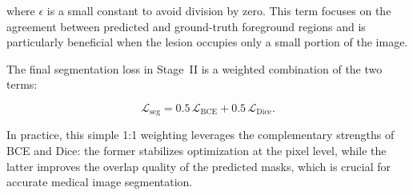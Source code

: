 \documentclass{article} %
\begin{document}
where $\epsilon$ is a small constant to avoid division by zero. This term focuses on the agreement between predicted and ground-truth foreground regions and is particularly beneficial when the lesion occupies only a small portion of the image.

The final segmentation loss in Stage~II is a weighted combination of the two terms:

\begin{equation}
\mathcal{L}_{\mathrm{seg}}
= 0.5\,\mathcal{L}_{\mathrm{BCE}} + 0.5\,\mathcal{L}_{\mathrm{Dice}}.
\end{equation}

In practice, this simple 1:1 weighting leverages the complementary strengths of BCE and Dice: the former stabilizes optimization at the pixel level, while the latter improves the overlap quality of the predicted masks, which is crucial for accurate medical image segmentation.
\end{document}
